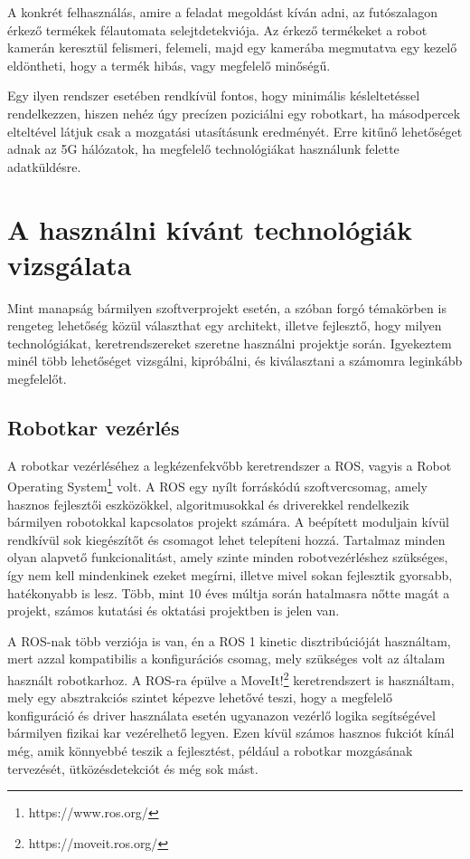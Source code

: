 \documentclass[11pt,a4paper,oneside]{article}
\begin{document}
A konkrét felhasználás, amire a feladat megoldást kíván adni, az futószalagon érkező termékek félautomata selejtdetekviója. Az érkező termékeket a robot kamerán keresztül felismeri, felemeli, majd egy kamerába megmutatva egy kezelő eldöntheti, hogy a termék hibás, vagy megfelelő minőségű.

Egy ilyen rendszer esetében rendkívül fontos, hogy minimális késleltetéssel rendelkezzen, hiszen nehéz úgy precízen poziciálni egy robotkart, ha másodpercek elteltével látjuk csak a mozgatási utasításunk eredményét. Erre kitűnő lehetőséget adnak az 5G hálózatok, ha megfelelő technológiákat használunk felette adatküldésre.

\newpage

\section{A használni kívánt technológiák vizsgálata}

Mint manapság bármilyen szoftverprojekt esetén, a szóban forgó témakörben is rengeteg lehetőség közül választhat egy architekt, illetve fejlesztő, hogy milyen technológiákat, keretrendszereket szeretne használni projektje során. Igyekeztem minél több lehetőséget vizsgálni, kipróbálni, és kiválasztani a számomra leginkább megfelelőt.

\subsection{Robotkar vezérlés}

A robotkar vezérléséhez a legkézenfekvőbb keretrendszer a ROS, vagyis a Robot Operating System\footnote{https://www.ros.org/} volt. A ROS egy nyílt forráskódú szoftvercsomag, amely hasznos fejlesztői eszközökkel, algoritmusokkal és driverekkel rendelkezik bármilyen robotokkal kapcsolatos projekt számára. A beépített moduljain kívül rendkívül sok kiegészítőt és csomagot lehet telepíteni hozzá. Tartalmaz minden olyan alapvető funkcionalitást, amely szinte minden robotvezérléshez szükséges, így nem kell mindenkinek ezeket megírni, illetve mivel sokan fejlesztik gyorsabb, hatékonyabb is lesz. Több, mint 10 éves múltja során hatalmasra nőtte magát a projekt, számos kutatási és oktatási projektben is jelen van.

A ROS-nak több verziója is van, én a ROS 1 kinetic disztribúcióját használtam, mert azzal kompatibilis a konfigurációs csomag, mely szükséges volt az általam használt robotkarhoz. A ROS-ra épülve a MoveIt!\footnote{https://moveit.ros.org/} keretrendszert is használtam, mely egy absztrakciós szintet képezve lehetővé teszi, hogy a megfelelő konfiguráció és driver használata esetén ugyanazon vezérlő logika segítségével bármilyen fizikai kar vezérelhető legyen. Ezen kívül számos hasznos fukciót kínál még, amik könnyebbé teszik a fejlesztést, például a robotkar mozgásának tervezését, ütközésdetekciót és még sok mást.
\end{document}
